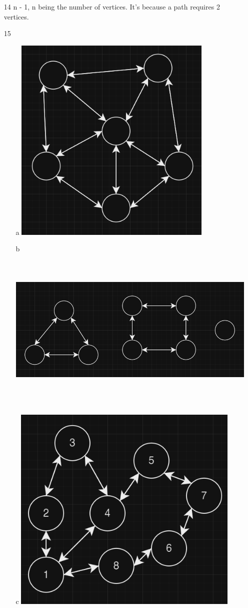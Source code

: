 \documentclass[12pt]{article}
\begin{document}
\begin{enumerate}
\begin{itemize}
	    \end{itemize}
	\item  [14] n - 1, n being the number of vertices. It's because a path requires 2 vertices.
	\item  [15]
	    \begin{itemize}
		\item [a] \includegraphics*[height=10cm]{3}
		\item [b] \includegraphics*[height=8cm]{4}
		\item [c] \includegraphics*[height=10cm]{5}
	    \end{itemize}
\end{enumerate}
\end{document}
